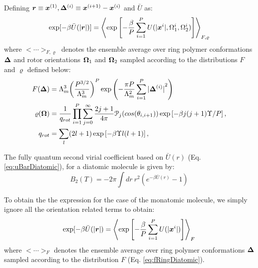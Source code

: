             Defining ${\boldsymbol {r}} \equiv {\boldsymbol {x}}^{(1)}, {\boldsymbol {\Delta}}^{(i)} \equiv {\boldsymbol {x}}^{(i+1)} - {\boldsymbol {x}}^{(i)}$ and $\bar{U}$ as:
            \begin{equation}
                \label{eq:uBarDiatomic}
                \exp [-\beta \bar{U} (|{\boldsymbol {r}}|)] = \left< \exp \left[ -\displaystyle\frac{\beta}{P} \sum_{i=1}^P U (|{\boldsymbol {x}}^i|,\Omega_1^i,\Omega_2^i) \right] \right>_{F,\varrho}
            \end{equation}
            where $<\cdots>_{F,\varrho}$ denotes the ensemble average over ring polymer conformations ${\boldsymbol {\Delta}}$ and rotor orientations ${\boldsymbol {\Omega}}_1$ and ${\boldsymbol {\Omega}}_2$ sampled according to the distributions $F$ and $\varrho$ defined below:
            \begin{subequations}
                \begin{align}
                    F({\boldsymbol {\Delta}}) &= \Lambda_m^3 { \left( \frac{P^{3/2}}{\Lambda_m^3} \right)}^P \exp \left( - \frac{\pi P}{\Lambda_m^2} \displaystyle\sum\limits_{i=1}^P {|{\boldsymbol {\Delta}}^{(i)}|}^2 \right)\label{eq:fRingDiatomic}\\
                    \varrho({\boldsymbol {\Omega}}) &= \frac{1}{q_{rot}} \displaystyle\prod_{i=1}^P \sum_{j=0}^\infty \frac{2j+1}{4 \pi} \mathcal{P}_j (cos (\theta_{i,i+1})) \exp \left[-\beta j(j+1) \Upsilon/ P \right],\label{eq:rhoDiatomic}\\
                    q_{rot} &= \displaystyle\sum_{l} (2l + 1) \exp \left[-\beta \Upsilon l (l+1) \right],\nonumber
                \end{align}
            \end{subequations}

            The fully quantum second virial coefficient based on $\bar{U} (r)$ (Eq. \eqref{eq:uBarDiatomic}), for a diatomic molecule is given by:
            \begin{equation}
            \label{eq:b2Diatomic}
                B_2 (T) = -2 \pi \displaystyle\int dr~ r^2 (e^{-\beta \bar{U} (r)} - 1)
            \end{equation}

            To obtain the the expression for the case of the monatomic molecule, we simply ignore all the orientation related terms to obtain:
            \begin{equation}
                \label{eq:uBarMonatomic}
                \exp [-\beta \bar{U} (|{\boldsymbol {r}}|) = \left< \exp \left[ -\displaystyle\frac{\beta}{P} \sum_{i=1}^P U (|{\boldsymbol {x}}^i|) \right] \right>_F
            \end{equation}
            where $<\cdots>_F$ denotes the ensemble average over ring polymer conformations ${\boldsymbol {\Delta}}$ sampled according to the distribution $F$ (Eq. \eqref{eq:fRingDiatomic}).
            
